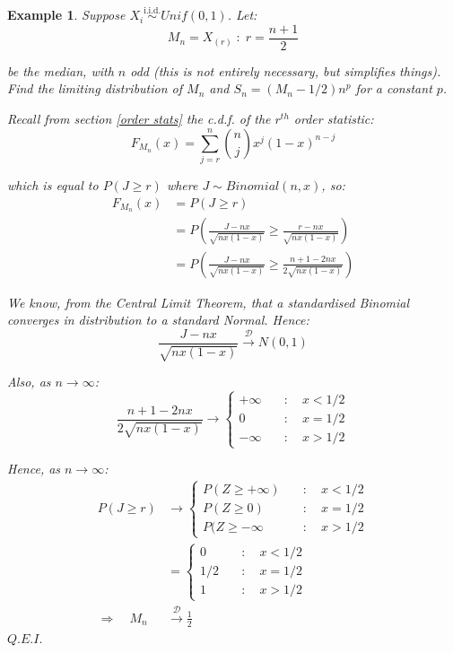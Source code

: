 \documentclass[12pt,a4paper]{article}
\newtheorem{ex}[thm]{Example}
\begin{document}
\begin{ex}\vspace{1cm}

Suppose $X_i \overset{\text{i.i.d.}}{\sim} Unif(0,1)$. Let:
$$M_n = X_{(r)}\; :\; r=\frac{n+1}{2}$$

be the median, with $n$ odd (this is not entirely necessary, but simplifies things). Find the limiting distribution of $M_n$ and $S_n = (M_n - 1/2)n^p$ for a constant $p$.\par\vspace{1cm}

Recall from section \ref{order stats} the c.d.f. of the $r^{th}$ order statistic:
$$F_{M_n}(x) = \sum_{j=r}^n \binom{n}{j}x^j (1-x)^{n-j}$$

which is equal to $P(J\geq r)$ where $J\sim Binomial(n,x)$, so:
\begin{align*}
F_{M_n}(x) &= P(J\geq r)\\
&= P\left(\frac{J-nx}{\sqrt{nx(1-x)}} \geq \frac{r-nx}{\sqrt{nx(1-x)}}\right)\\
&= P\left(\frac{J-nx}{\sqrt{nx(1-x)}} \geq \frac{n+1-2nx}{2\sqrt{nx(1-x)}}\right)
\end{align*}

We know, from the Central Limit Theorem, that a standardised Binomial converges in distribution to a standard Normal. Hence:
$$\frac{J-nx}{\sqrt{nx(1-x)}} \xrightarrow{\mathscr{D}} N(0,1)$$

Also, as $n\to\infty$:
$$\frac{n+1-2nx}{2\sqrt{nx(1-x)}} \rightarrow \left\{\begin{array}{cc} +\infty \quad&:\quad x<1/2\\ 0\quad&:\quad x=1/2\\-\infty\quad&:\quad x>1/2\end{array}\right.$$

Hence, as $n\to\infty$:
\begin{align*}
P(J\geq r) &\to \left\{\begin{array}{cc} P(Z\geq +\infty)\quad&:\quad x<1/2\\ P(Z \geq 0)\quad&:\quad x=1/2\\ P(Z\geq -\infty\quad&:\quad x>1/2\end{array}\right.\\
&= \left\{\begin{array}{cc} 0\quad&:\quad x<1/2\\ 1/2\quad&:\quad x=1/2\\ 1\quad&:\quad x>1/2\end{array}\right.\\
\Rightarrow\quad M_n &\xrightarrow{\mathscr{D}} \frac{1}{2}
\end{align*}\hfill$Q.E.I.$


\end{ex}
\end{document}
